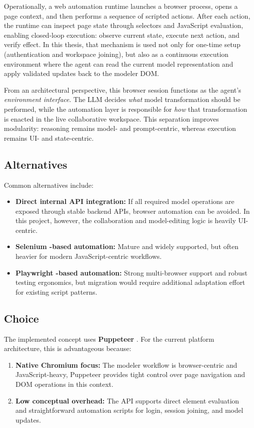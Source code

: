Operationally, a web automation runtime launches a browser process, opens a page context, and then performs a sequence of scripted actions. After each action, the runtime can inspect page state through selectors and JavaScript evaluation, enabling closed-loop execution: observe current state, execute next action, and verify effect. In this thesis, that mechanism is used not only for one-time setup (authentication and workspace joining), but also as a continuous execution environment where the agent can read the current model representation and apply validated updates back to the modeler DOM.

From an architectural perspective, this browser session functions as the agent's \emph{environment interface}. The LLM decides \emph{what} model transformation should be performed, while the automation layer is responsible for \emph{how} that transformation is enacted in the live collaborative workspace. This separation improves modularity: reasoning remains model- and prompt-centric, whereas execution remains UI- and state-centric.

\subsection{Alternatives}
Common alternatives include:
\begin{itemize}
    \item \textbf{Direct internal API integration:} If all required model operations are exposed through stable backend APIs, browser automation can be avoided. In this project, however, the collaboration and model-editing logic is heavily UI-centric.
    \item \textbf{Selenium \cite{seleniumSelenium}-based automation:} Mature and widely supported, but often heavier for modern JavaScript-centric workflows.
    \item \textbf{Playwright \cite{playwrightFastReliable}-based automation:} Strong multi-browser support and robust testing ergonomics, but migration would require additional adaptation effort for existing script patterns.
\end{itemize}

\subsection{Choice}
The implemented concept uses \textbf{Puppeteer} \cite{pptrPuppeteerPuppeteer}. For the current platform architecture, this is advantageous because:
\begin{enumerate}
    \item \textbf{Native Chromium \cite{chromiumHome} focus:} The modeler workflow is browser-centric and JavaScript-heavy, Puppeteer provides tight control over page navigation and DOM operations in this context.
    \item \textbf{Low conceptual overhead:} The API supports direct element evaluation and straightforward automation scripts for login, session joining, and model updates.
\end{enumerate}

